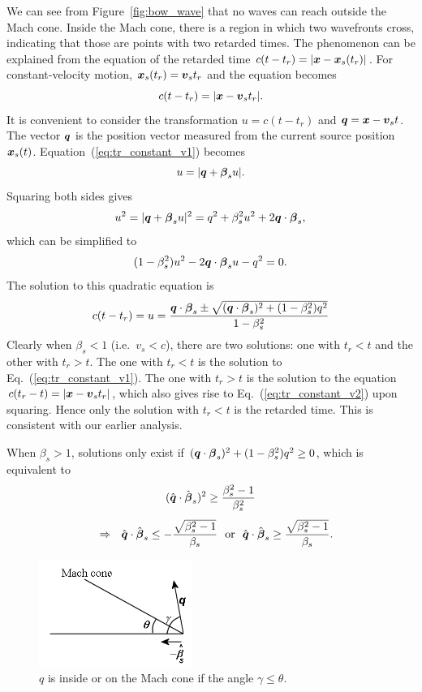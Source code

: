 \documentclass[12pt]{article}
\newcommand \beq {\begin{equation}}
\newcommand \eeq {\end{equation}}
\newcommand{\ve}[1]{\mbox{\boldmath $#1$}}
\begin{document}
We can see from Figure~\ref{fig:bow_wave} that no waves can reach outside the Mach cone. 
Inside the Mach cone, there is a region in which two wavefronts cross, indicating that 
those are points with two retarded times. The phenomenon can be explained from the equation 
of the retarded time $c(t-t_r)=|\ve{x}-\ve{x}_s(t_r)|$. For constant-velocity motion, 
$\ve{x}_s(t_r)=\ve{v}_s t_r$ and the equation becomes 
\beq
  c(t-t_r) = |\ve{x}-\ve{v}_s t_r| .
\label{eq:tr_constant_v1}
\eeq
It is convenient to consider the transformation $u=c(t-t_r)$ and $\ve{q}=\ve{x}-\ve{v}_st$. 
The vector $\ve{q}$ is the position vector measured from the current source position 
$\ve{x}_s(t)$. Equation~(\ref{eq:tr_constant_v1}) becomes 
\beq
  u = |\ve{q}+\ve{\beta}_s u| .
\eeq
Squaring both sides gives 
\beq
   u^2= |\ve{q}+\ve{\beta}_s u|^2 = q^2 + \beta_s^2 u^2 + 2\ve{q}\cdot \ve{\beta}_s ,
\label{eq:tr_constant_v2}
\eeq
which can be simplified to 
\beq
  (1-\beta_s^2)u^2 - 2 \ve{q}\cdot \ve{\beta}_s u - q^2 = 0  .
\eeq
The solution to this quadratic equation is 
\beq
  c(t-t_r) = u= \frac{\ve{q}\cdot \ve{\beta}_s \pm \sqrt{(\ve{q}\cdot \ve{\beta}_s)^2 
+ (1-\beta_s^2)q^2}}{1-\beta_s^2}
\label{eq:tr_constant_v3}
\eeq
Clearly when $\beta_s<1$ (i.e.\ $v_s<c$), there are two solutions: 
one with $t_r<t$ and the other with $t_r>t$. The one with 
$t_r<t$ is the solution to Eq.~(\ref{eq:tr_constant_v1}). 
The one with $t_r>t$ is the solution to the equation $c(t_r-t)=|\ve{x}-\ve{v}_s t_r|$, 
which also gives rise to Eq.~(\ref{eq:tr_constant_v2}) upon squaring. Hence only 
the solution with $t_r<t$ is the retarded time. This is consistent with our earlier 
analysis.

When $\beta_s>1$, solutions only exist if $(\ve{q}\cdot \ve{\beta}_s)^2 +(1-\beta_s^2)q^2\geq 0$, 
which is equivalent to 
\beq
  (\hat{\ve{q}}\cdot \hat{\ve{\beta}}_s)^2 \geq \frac{\beta_s^2-1}{\beta_s^2}
\eeq
\beq
\ \ \ \Rightarrow \ \ 
  \hat{\ve{q}}\cdot \hat{\ve{\beta}}_s \leq -\frac{\sqrt{\beta_s^2-1}}{\beta_s} 
\ \ {\rm or} \ \ 
  \hat{\ve{q}}\cdot \hat{\ve{\beta}}_s \geq \frac{\sqrt{\beta_s^2-1}}{\beta_s} .
\eeq

\begin{figure}
\includegraphics[width=5cm]{MachCone-inout.png}
\caption{\ve{q} is inside or on the Mach cone if the angle $\gamma \leq \theta$.}
\label{fig:MachConeInOut}
\end{figure}
\end{document}
